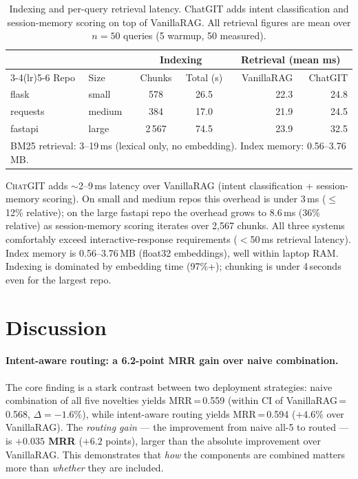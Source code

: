 \documentclass[runningheads]{llncs}
\newcommand{\chatgit}{\textsc{ChatGIT}\xspace}
\begin{document}
\begin{table}[t]
\centering
\caption{Indexing and per-query retrieval latency. ChatGIT adds
intent classification and session-memory scoring on top of
VanillaRAG. All retrieval figures are mean over $n{=}50$ queries
(5 warmup, 50 measured).}
\label{tab:latency}
\footnotesize
\begin{tabular}{llccrr}
\toprule
\multicolumn{2}{l}{} & \multicolumn{2}{c}{Indexing} &
\multicolumn{2}{c}{Retrieval (mean ms)} \\
\cmidrule(lr){3-4}\cmidrule(lr){5-6}
Repo & Size & Chunks & Total (s) & VanillaRAG & ChatGIT \\
\midrule
flask   & small  &   578 & 26.5 & 22.3 & 24.8 \\
requests& medium &   384 & 17.0 & 21.9 & 24.5 \\
fastapi & large  & 2\,567 & 74.5 & 23.9 & 32.5 \\
\midrule
\multicolumn{6}{l}{\small BM25 retrieval: 3--19\,ms (lexical only, no embedding).
  Index memory: 0.56--3.76\,MB.} \\
\bottomrule
\end{tabular}
\end{table}

\chatgit adds ${\sim}$2--9\,ms latency over VanillaRAG (intent
classification + session-memory scoring). On small and medium
repos this overhead is under 3\,ms (${\leq}$12\% relative);
on the large fastapi repo the overhead grows to 8.6\,ms (36\%
relative) as session-memory scoring iterates over 2{,}567 chunks.
All three systems comfortably exceed interactive-response
requirements ($<$50\,ms retrieval latency). Index memory is
0.56--3.76\,MB (float32 embeddings), well within laptop RAM.
Indexing is dominated by embedding time (97\%+); chunking is
under 4\,seconds even for the largest repo.

\section{Discussion}
\label{sec:disc}

\paragraph{Intent-aware routing: a 6.2-point MRR gain over naive combination.}
The core finding is a stark contrast between two deployment
strategies: naive combination of all five novelties yields MRR\,=\,0.559
(within CI of VanillaRAG\,=\,0.568, $\Delta{=}{-}1.6\%$),
while intent-aware routing yields MRR\,=\,0.594 ($+4.6\%$ over
VanillaRAG). The \emph{routing gain} --- the improvement from naive
all-5 to routed --- is \textbf{$+0.035$ MRR} ($+6.2$ points),
larger than the absolute improvement over VanillaRAG. This
demonstrates that \emph{how} the components are combined
matters more than \emph{whether} they are included.
\end{document}
